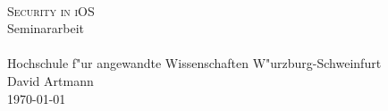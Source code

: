 \documentclass[12pt,a4paper]{scrartcl}
\begin{document}
	

\begin{titlepage}
   	\mbox{}\vspace{5\baselineskip}\\
   	\rmfamily\huge
   	\centering
	\textsc{Security in iOS}
	\\[3ex]
   	Seminararbeit
   	\rmfamily\Large
   	\vspace{1\baselineskip}\\
   	\mbox{}
	\vspace{3\baselineskip}\\
	Hochschule f"ur angewandte Wissenschaften W"urzburg-Schweinfurt
   	\vspace{5\baselineskip}\\
   	\rmfamily\Large
   	David Artmann
   	\vspace{1\baselineskip}\\
   	\today
\end{titlepage}

	\tableofcontents
	\newpage
	
	\listoffigures
	
	\newpage
	
	
	\newpage
	
	
	\newpage
	
	
	\newpage
	
	
	\newpage
\end{document}
